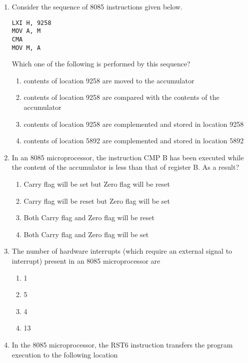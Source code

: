 \documentclass[journal,12pt,twocolumn]{IEEEtran}
\begin{document}
\begin{enumerate}
\item Consider the sequence of 8085 instructions given below.
\begin{verbatim}
LXI H, 9258
MOV A, M
CMA
MOV M, A
\end{verbatim}
Which one of the following is performed by this sequence?  

    \begin{enumerate}
     \item contents of location 9258 are moved to the accumulator 
     \item contents of location 9258 are compared with the contents of the accumulator
     \item contents of location 9258 are complemented and stored in location 9258
     \item contents of location 5892 are complemented and stored in location 5892
    \end{enumerate}
   
    
    \item In an 8085 microprocessor, the instruction CMP B has been executed while the
content of the accumulator is less than that of register B. As a result?
                       
   \begin{enumerate}
     \item Carry flag will be set but Zero flag will be reset 
      \item Carry flag will be reset but Zero flag will be set
      \item Both Carry flag and Zero flag will be reset
      \item Both Carry flag and Zero flag will be set
    \end{enumerate} 
    
     \item The number of hardware interrupts (which require an external signal to interrupt)
present in an 8085 microprocessor are
    \begin{enumerate}
      \item 1
      \item 5
      \item 4
      \item 13
    \end{enumerate}
     \item In the 8085 microprocessor, the RST6 instruction transfers the program
execution to the following location
                         

\end{enumerate}
\end{document}
